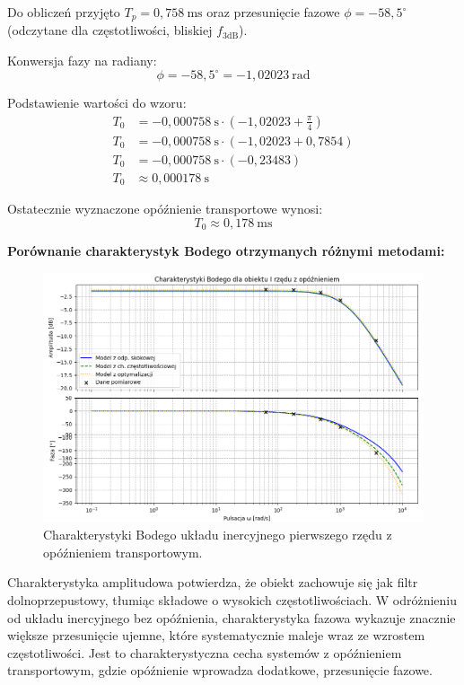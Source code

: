 \documentclass[12pt,a4paper]{article}
\begin{document}
	Do obliczeń przyjęto $T_p = 0{,}758~\text{ms}$ oraz przesunięcie fazowe $\phi = -58{,}5^{\circ}$ (odczytane dla częstotliwości, bliskiej $f_{3\text{dB}}$).
	
	Konwersja fazy na radiany:
	\[
	\phi = -58{,}5^{\circ} = -1{,}02023~\text{rad}
	\]
	
	Podstawienie wartości do wzoru:
	\begin{align*}
		T_0 &= -0{,}000758~\text{s} \cdot \left( -1{,}02023 + \frac{\pi}{4} \right) \\
		T_0 &= -0{,}000758~\text{s} \cdot \left( -1{,}02023 + 0{,}7854 \right) \\
		T_0 &= -0{,}000758~\text{s} \cdot (-0{,}23483) \\
		T_0 &\approx 0{,}000178~\text{s}
	\end{align*}
	
	Ostatecznie wyznaczone opóźnienie transportowe wynosi:
	\[
	\boxed{T_0 \approx 0{,}178~\text{ms}}
	\]
	
	\textbf{Porównanie charakterystyk Bodego otrzymanych różnymi metodami:}
	\begin{figure}[H]
		\centering
		\includegraphics[width=1\linewidth]{zdjecia/1rzad_z_opz.png}
		\caption{Charakterystyki Bodego układu inercyjnego pierwszego rzędu z opóźnieniem transportowym.}
		\label{fig:Body1_z_opz}
	\end{figure}
	
	Charakterystyka amplitudowa potwierdza, że obiekt zachowuje się jak filtr dolnoprzepustowy, tłumiąc składowe o wysokich częstotliwościach. W odróżnieniu od układu inercyjnego bez opóźnienia, charakterystyka fazowa wykazuje znacznie większe przesunięcie ujemne, które systematycznie maleje wraz ze wzrostem częstotliwości. Jest to charakterystyczna cecha systemów z opóźnieniem transportowym, gdzie opóźnienie wprowadza dodatkowe, przesunięcie fazowe.
	
\end{document}

